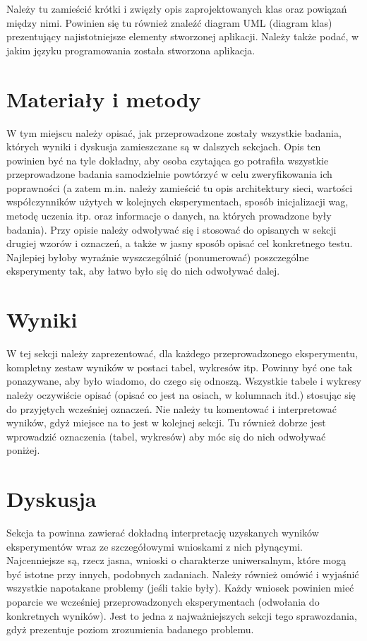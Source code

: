 \documentclass{classrep}
\begin{document}
{\color{blue}
Należy tu zamieścić krótki i zwięzły opis zaprojektowanych klas oraz powiązań
między nimi. Powinien się tu również znaleźć diagram UML  (diagram klas)
prezentujący najistotniejsze elementy stworzonej aplikacji. Należy także
podać, w jakim języku programowania została stworzona aplikacja. }

\section{Materiały i metody}
{\color{blue}
W tym miejscu należy opisać, jak przeprowadzone zostały wszystkie badania,
których wyniki i dyskusja zamieszczane są w dalszych sekcjach. Opis ten
powinien być na tyle dokładny, aby osoba czytająca go potrafiła wszystkie
przeprowadzone badania samodzielnie powtórzyć w celu zweryfikowania ich
poprawności (a zatem m.in. należy zamieścić tu opis architektury sieci,
wartości współczynników użytych w kolejnych eksperymentach, sposób
inicjalizacji wag, metodę uczenia itp. oraz informacje o danych, na których
prowadzone były badania). Przy opisie należy odwoływać się i stosować do
opisanych w sekcji drugiej wzorów i oznaczeń, a także w jasny sposób opisać
cel konkretnego testu. Najlepiej byłoby wyraźnie wyszczególnić (ponumerować)
poszczególne eksperymenty tak, aby łatwo było się do nich odwoływać dalej.}

\section{Wyniki}
{\color{blue}
W tej sekcji należy zaprezentować, dla każdego przeprowadzonego eksperymentu,
kompletny zestaw wyników w postaci tabel, wykresów itp. Powinny być one tak
ponazywane, aby było wiadomo, do czego się odnoszą. Wszystkie tabele i wykresy
należy oczywiście opisać (opisać co jest na osiach, w kolumnach itd.) stosując
się do przyjętych wcześniej oznaczeń. Nie należy tu komentować i interpretować
wyników, gdyż miejsce na to jest w kolejnej sekcji. Tu również dobrze jest
wprowadzić oznaczenia (tabel, wykresów) aby móc się do nich odwoływać
poniżej.}

\section{Dyskusja}
{\color{blue}
Sekcja ta powinna zawierać dokładną interpretację uzyskanych wyników
eksperymentów wraz ze szczegółowymi wnioskami z nich płynącymi. Najcenniejsze
są, rzecz jasna, wnioski o charakterze uniwersalnym, które mogą być istotne
przy innych, podobnych zadaniach. Należy również omówić i wyjaśnić wszystkie
napotakane problemy (jeśli takie były). Każdy wniosek powinien mieć poparcie
we wcześniej przeprowadzonych eksperymentach (odwołania do konkretnych
wyników). Jest to jedna z najważniejszych sekcji tego sprawozdania, gdyż
prezentuje poziom zrozumienia badanego problemu.}
\end{document}

